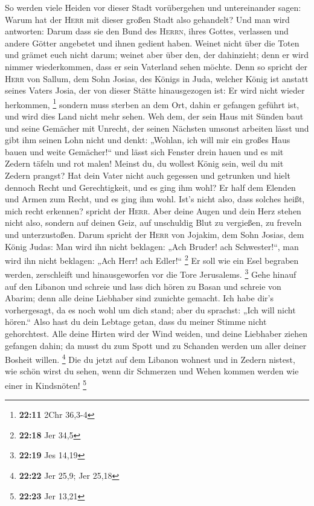  So werden viele Heiden vor dieser Stadt vorübergehen und
untereinander sagen: Warum hat der \textsc{Herr} mit dieser großen Stadt
also gehandelt?  Und man wird antworten: Darum dass sie
den Bund des \textsc{Herrn}, ihres Gottes, verlassen und andere Götter
angebetet und ihnen gedient haben.  Weinet nicht über die
Toten und grämet euch nicht darum; weinet aber über den, der dahinzieht;
denn er wird nimmer wiederkommen, dass er sein Vaterland sehen möchte.
 Denn so spricht der \textsc{Herr} von Sallum, dem Sohn
Josias, des Königs in Juda, welcher König ist anstatt seines Vaters
Josia, der von dieser Stätte hinausgezogen ist: Er wird nicht wieder
herkommen, \footnote{\textbf{22:11} 2Chr 36,3-4}  sondern
muss sterben an dem Ort, dahin er gefangen geführt ist, und wird dies
Land nicht mehr sehen.  Weh dem, der sein Haus mit Sünden
baut und seine Gemächer mit Unrecht, der seinen Nächsten umsonst
arbeiten lässt und gibt ihm seinen Lohn nicht  und denkt:
„Wohlan, ich will mir ein großes Haus bauen und weite Gemächer!{}`` und
lässt sich Fenster drein hauen und es mit Zedern täfeln und rot malen!
 Meinst du, du wollest König sein, weil du mit Zedern
prangst? Hat dein Vater nicht auch gegessen und getrunken und hielt
dennoch Recht und Gerechtigkeit, und es ging ihm wohl? 
Er half dem Elenden und Armen zum Recht, und es ging ihm wohl. Ist's
nicht also, dass solches heißt, mich recht erkennen? spricht der
\textsc{Herr}.  Aber deine Augen und dein Herz stehen
nicht also, sondern auf deinen Geiz, auf unschuldig Blut zu vergießen,
zu freveln und unterzustoßen.  Darum spricht der
\textsc{Herr} von Jojakim, dem Sohn Josias, dem König Judas: Man wird
ihn nicht beklagen: „Ach Bruder! ach Schwester!{}``, man wird ihn nicht
beklagen: „Ach Herr! ach Edler!{}`` \footnote{\textbf{22:18} Jer 34,5}
 Er soll wie ein Esel begraben werden, zerschleift und
hinausgeworfen vor die Tore Jerusalems. \footnote{\textbf{22:19} Jes
  14,19}  Gehe hinauf auf den Libanon und schreie und
lass dich hören zu Basan und schreie von Abarim; denn alle deine
Liebhaber sind zunichte gemacht.  Ich habe dir's
vorhergesagt, da es noch wohl um dich stand; aber du sprachst: „Ich will
nicht hören.`` Also hast du dein Lebtage getan, dass du meiner Stimme
nicht gehorchtest.  Alle deine Hirten wird der Wind
weiden, und deine Liebhaber ziehen gefangen dahin; da musst du zum Spott
und zu Schanden werden um aller deiner Bosheit willen. \footnote{\textbf{22:22}
  Jer 25,9; Jer 25,18}  Die du jetzt auf dem Libanon
wohnest und in Zedern nistest, wie schön wirst du sehen, wenn dir
Schmerzen und Wehen kommen werden wie einer in Kindsnöten! \footnote{\textbf{22:23}
  Jer 13,21}


